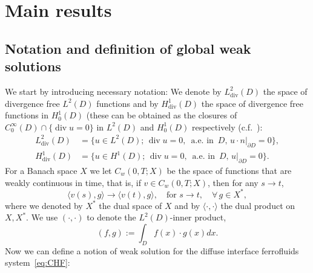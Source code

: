 \documentclass[10pt,letterpaper,twoside]{amsart}
\theoremstyle{definition}{\newtheorem{definition}[lemma]{Definition}}
\theoremstyle{note}{\newtheorem{claim}{Claim}[section]
\newtheorem*{claim*}{Claim}}
\numberwithin{equation}{section}
\newcommand{\dom}{D}
\newcommand{\Div}{\operatorname{div}}
\newcommand{\hdiv}{L^2_{\Div}(\dom)}
\newcommand{\V}{H^1_{\Div}(\dom)}
\begin{document}
\section{Main results}\label{S2}
\subsection{Notation and definition of global weak solutions}
We start by introducing necessary notation: We denote by $\hdiv$ the space of divergence free $L^2(\dom)$ functions and by $\V$ the space of divergence free functions in $H^1_0(\dom)$ (these can be obtained as the closures of $C^\infty_0(\dom)\cap \{\Div u=0\}$ in $L^2(\dom)$ and $H^1_0(\dom)$ respectively (c.f.~\cite{Temam2001}):
\begin{equation*}
	\begin{split}
		\hdiv &= \{u\in L^2(\dom);\, \Div u = 0,\,  \text{ a.e. in }\, \dom,\, u\cdot n|_{\partial \dom}=0\}, \\
		\V &=\{u\in H^1(\dom);\, \Div u = 0,\,  \text{ a.e. in }\, \dom,\, u|_{\partial \dom}=0\}. 
	\end{split}
\end{equation*}
For a Banach space $X$ we let $C_w(0,T;X)$ be the space of functions that are weakly continuous in time, that is, if $v\in C_w(0,T;X)$, then for any $s\to t$,
\begin{equation*}
	\langle v(s),g\rangle\to \langle v(t), g\rangle,\quad \text{for } s\to t, \quad \forall \, g\in X^*,
\end{equation*}
where we denoted by $X^*$ the dual space of $X$ and by $\langle\cdot,\cdot\rangle$ the dual product on $X,X^*$.
We use $(\cdot,\cdot)$ to denote the $L^2(\dom)$-inner product,
\begin{equation*}
	(f,g):= \int_{\dom} f(x)\cdot g(x) dx.
\end{equation*}
Now we can define a notion of weak solution for the diffuse interface ferrofluids system~\eqref{eq:CHF}:
\end{document}
